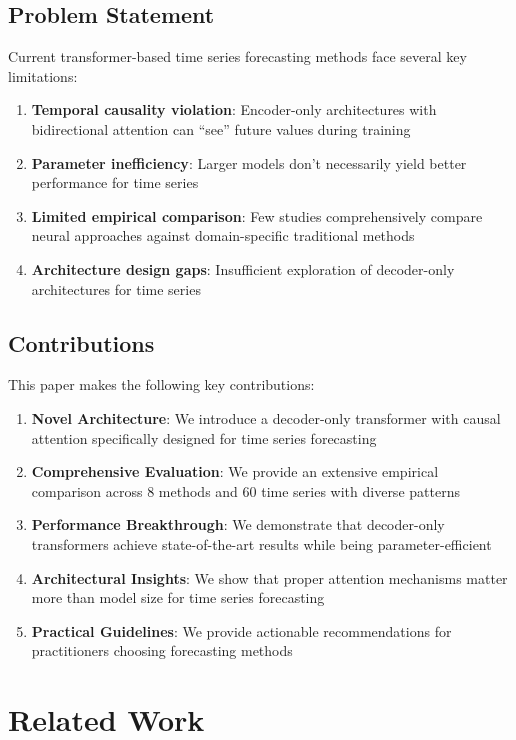 \documentclass[11pt]{article}
\begin{document}
\subsection{Problem Statement}

Current transformer-based time series forecasting methods face several key limitations:

\begin{enumerate}
\item \textbf{Temporal causality violation}: Encoder-only architectures with bidirectional attention can ``see'' future values during training
\item \textbf{Parameter inefficiency}: Larger models don't necessarily yield better performance for time series
\item \textbf{Limited empirical comparison}: Few studies comprehensively compare neural approaches against domain-specific traditional methods
\item \textbf{Architecture design gaps}: Insufficient exploration of decoder-only architectures for time series
\end{enumerate}

\subsection{Contributions}

This paper makes the following key contributions:

\begin{enumerate}
\item \textbf{Novel Architecture}: We introduce a decoder-only transformer with causal attention specifically designed for time series forecasting
\item \textbf{Comprehensive Evaluation}: We provide an extensive empirical comparison across 8 methods and 60 time series with diverse patterns
\item \textbf{Performance Breakthrough}: We demonstrate that decoder-only transformers achieve state-of-the-art results while being parameter-efficient
\item \textbf{Architectural Insights}: We show that proper attention mechanisms matter more than model size for time series forecasting
\item \textbf{Practical Guidelines}: We provide actionable recommendations for practitioners choosing forecasting methods
\end{enumerate}

\section{Related Work}
\end{document}
